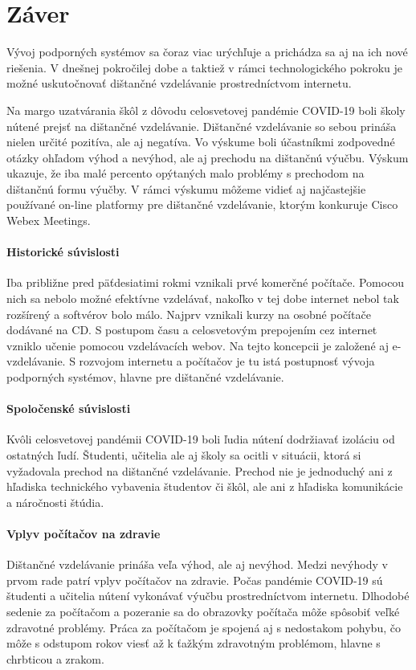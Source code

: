 \documentclass[10pt,oneside,slovak,a4paper]{article}
\begin{document}
\section*{Záver}
Vývoj podporných systémov sa čoraz viac urýchľuje a prichádza sa aj na ich nové riešenia.
V dnešnej pokročilej dobe a taktiež v rámci technologického pokroku je možné uskutočnovať dištančné vzdelávanie prostredníctvom internetu.

Na margo uzatvárania škôl z dôvodu celosvetovej pandémie COVID-19 boli školy nútené prejsť na dištančné vzdelávanie.
Dištančné vzdelávanie so sebou prináša nielen určité pozitíva, ale aj negatíva. 
Vo výskume boli účastníkmi zodpovedné otázky ohľadom výhod a nevýhod, ale aj prechodu na dištančnú výučbu.
Výskum ukazuje, že iba malé percento opýtaných malo problémy s prechodom na dištančnú formu výučby.
V rámci výskumu môžeme vidieť aj najčastejšie používané on-line platformy pre dištančné vzdelávanie, ktorým konkuruje Cisco Webex Meetings.

\paragraph{Historické súvislosti}
Iba približne pred päťdesiatimi rokmi vznikali prvé komerčné počítače.
Pomocou nich sa nebolo možné efektívne vzdelávať, nakoľko v tej dobe internet nebol tak rozšírený a softvérov bolo málo.
Najprv vznikali kurzy na osobné počítače dodávané na CD. S postupom času a celosvetovým prepojením cez internet vzniklo učenie pomocou vzdelávacích webov.
Na tejto koncepcii je založené aj e-vzdelávanie. S rozvojom internetu a počítačov je tu istá postupnosť vývoja podporných systémov, hlavne pre dištančné vzdelávanie.

\paragraph{Spoločenské súvislosti}
Kvôli celosvetovej pandémii COVID-19 boli ľudia nútení dodržiavať izoláciu od ostatných ľudí.
Študenti, učitelia ale aj školy sa ocitli v situácii, ktorá si vyžadovala prechod na dištančné vzdelávanie.
Prechod nie je jednoduchý ani z hľadiska technického vybavenia študentov či škôl, ale ani z hľadiska komunikácie a náročnosti štúdia. 

\paragraph{Vplyv počítačov na zdravie}
Dištančné vzdelávanie prináša veľa výhod, ale aj nevýhod. Medzi nevýhody v prvom rade patrí vplyv počítačov na zdravie.
Počas pandémie COVID-19 sú študenti a učitelia nútení vykonávať výučbu prostredníctvom internetu.
Dlhodobé sedenie za počítačom a pozeranie sa do obrazovky počítača môže spôsobiť veľké zdravotné problémy.
Práca za počítačom je spojená aj s nedostakom pohybu, čo môže s odstupom rokov viesť až k ťažkým zdravotným problémom, hlavne s chrbticou a zrakom.




\end{document}
